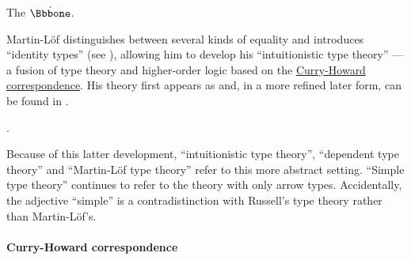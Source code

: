 \begin{definition}\label{def:unit_type}
  The  \( \syn\Bbbone \).
\end{definition}

\begin{definition}\label{def:product_type}
\end{definition}

\begin{definition}\label{def:sum_type}
\end{definition}

\begin{concept}\label{con:identity_types}

  Martin-L\"of distinguishes between several kinds of equality and introduces \enquote{identity types} (see ), allowing him to develop his \enquote{intuitionistic type theory} --- a fusion of type theory and higher-order logic based on the \hyperref[con:curry_howard_correspondence]{Curry-Howard correspondence}. His theory first appears as \cite{MartinLöf1975IntuitionisticTypeTheory} and, in a more refined later form, can be found in \cite{MartinLöf1984IntuitionisticTypeTheory}.
\end{concept}

\begin{concept}\label{con:homotopy_type_theory}
\end{concept}

\begin{concept}\label{con:dependent_types}

  .
\end{concept}

\begin{remark}\label{rem:dependent_type_theory}
  Because of this latter development, \enquote{intuitionistic type theory}, \enquote{dependent type theory} and \enquote{Martin-L\"of type theory} refer to this more abstract setting. \enquote{Simple type theory} continues to refer to the theory with only arrow types. Accidentally, the adjective \enquote{simple} is a contradistinction with Russell's type theory rather than Martin-L\"of's.
\end{remark}

\paragraph{Curry-Howard correspondence}\hfill

